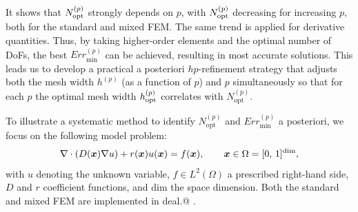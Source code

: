 \documentclass[a4paper]{article}
\makeatletter
\newcommand*{\rom}[1]{\expandafter\@slowromancap\romannumeral #1@}
\makeatother
\begin{document}
It shows that $N_{\rm opt} ^{(p)}$ strongly depends on $p$, with $N_{\rm opt} ^{(p)}$ decreasing for increasing $p$, both for the standard and mixed FEM.
The same trend is applied for derivative quantities.
Thus, by taking higher-order elements and the optimal number of DoFs, the best ${Err}_{\text{min}}^{(p)}$ can be achieved, resulting in most accurate solutions. 
This leads us to develop a practical a posteriori $hp$-refinement strategy that adjusts both the mesh width $h^{(p)}$ (as a function of $p$) and $p$ simultaneously so that for each $p$ the optimal mesh width $h^{(p)}_{\rm opt}$ correlates with $N_{\text{opt}}^{(p)}$.


To illustrate a systematic method to identify $N_{\text{opt}} ^{(p)}$ and ${Err}_{\text{min}}^{(p)}$ a posteriori, we focus on the following model problem:
\begin{equation*}
 \nabla \cdot \left(D(\bm{x}) \nabla u \right) + r(\bm{x})u(\bm{x}) = f(\bm{x}),\qquad \bm{x} \in \Omega = [0,\,1]^{\rm dim},	\label{1D_general_Helmholtz_equation}
\end{equation*}
with $u$ denoting the unknown variable, $f \in L^2 (\Omega)$ a prescribed right-hand side, $D$ and $r$ coefficient functions, and dim the space dimension.
Both the standard and mixed FEM are implemented in deal.\rom{2} \cite{alzetta2018deal}.
\end{document}
